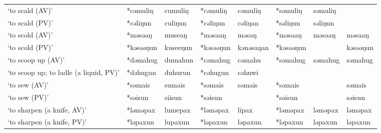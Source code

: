 \begin{landscape}
\begin{longtable}[c]{@{}p{3cm}<{\raggedright}p{2.75cm}<{\raggedright}p{2.75cm}<{\raggedright}p{2.75cm}<{\raggedright}p{2.75cm}<{\raggedright}p{2.75cm}<{\raggedright}p{2.75cm}<{\raggedright}p{2.75cm}<{\raggedright}@{}}
`to scald (AV)'                                      & *cəmuliŋ     & cumuliŋ                       & *cəmuliŋ       & cəmuliŋ                    & *səmuliŋ         & səmuliŋ                  &                                   \\
`to scald (PV)'                                      & *cəliŋun     & culiŋun                       & *cəliŋun       & cəliŋan                    & *səliŋun         & səliŋun                  &                                   \\
`to scold (AV)'                                      & *məsəaŋ      & museaŋ                        & *məsaaŋ        & məsaŋ                      & *məsaaŋ          & məsaaŋ                   & məsaaŋ                            \\
`to scold (PV)'                                      & *kəsəəŋun    & kuseeŋun                      & *kəsəəŋun      & kənəsaŋan                  & *kəsəəŋun        &                          & kəsəəŋun                          \\
`to scoop up (AV)'                                   & *dəmahug     & dumahun                       & *cəmahug       & cəmahu                     & *səmahug         & səmahug                  & səmahug                           \\
`to scoop up; to ladle (a liquid, PV)'               & *dəhugun     & duhurun                       & *cəhugun       & cəhuwi                     &                  &                          &                                   \\
`to sew (AV)'                                        & *səmais      & sumais                        & *səmais        & səmais                     & *səmais          &                          & səmais                            \\
`to sew (PV)'                                        & *səisun      & siisun                        & *səisun        &                            & *səisun          &                          & səisun                            \\
`to sharpen (a knife, AV)'                           & *ləməpax     & lumepax                       & *ləməpax       & lipax                      & *ləməpax         & ləməpax                  & ləməpax                           \\
`to sharpen (a knife, PV)'                           & *ləpaxun     & lupaxun                       & *ləpaxun       & ləpaxun                    & *ləpaxun         & ləpaxun                  & ləpaxun                           \\

\end{longtable}
\end{landscape}
